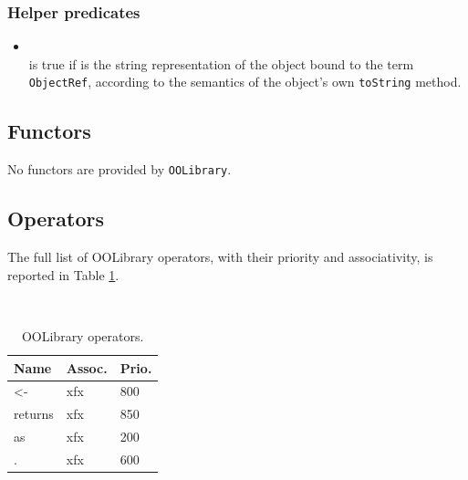 \subsubsection{Helper predicates}

\begin{itemize}
\item {}\\
    \noindent{} is true if  is the string representation of the object bound to the term \texttt{ObjectRef}, according to the semantics of the object's own \texttt{toString} method.

\end{itemize}

\subsection{Functors}

No functors are provided by \texttt{OOLibrary}.

\subsection{Operators}

The full list of OOLibrary operators, with their priority and associativity, is reported in Table \ref{tab:javalibrary-operators}.

\begin{table}[h]
    \begin{center}{\small\tt
    \begin{tabular}{p{2cm}|p{1cm}|p{1cm}}\hline\hline
    Name & Assoc. & Prio. \\ \hline\hline
    <-   & xfx & 800\\
    returns     & xfx & 850 \\
    as   & xfx & 200\\
    .   & xfx & 600\\
    \hline\hline
    \end{tabular}
    }\end{center}
    \caption{OOLibrary operators.}\label{tab:javalibrary-operators}
\end{table}

